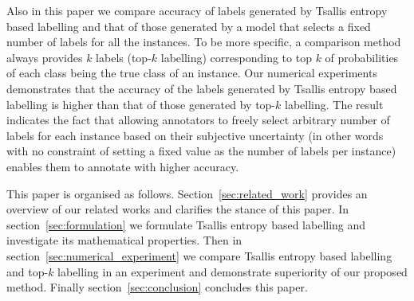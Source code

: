 \documentclass[a4paper,conference]{IEEEtran}
\begin{document}
Also in this paper we compare accuracy of labels generated by Tsallis entropy based labelling and that of those generated by a model that selects a fixed number of labels for all the instances.
To be more specific, a comparison method always provides $k$ labels (top-$k$ labelling) corresponding to top $k$ of probabilities of each class being the true class of an instance.
Our numerical experiments demonstrates that the accuracy of the labels generated by Tsallis entropy based labelling is higher than that of those generated by top-$k$ labelling.
The result indicates the fact that allowing annotators to freely select arbitrary number of labels for each instance based on their subjective uncertainty (in other words with no constraint of setting a fixed value as the number of labels per instance) enables them to annotate with higher accuracy.

This paper is organised as follows.
Section~\ref{sec:related_work} provides an overview of our related works and clarifies the stance of this paper. 
In section~\ref{sec:formulation} we formulate Tsallis entropy based labelling and investigate its mathematical properties.
Then in section~\ref{sec:numerical_experiment} we compare Tsallis entropy based labelling and top-$k$ labelling in an experiment and demonstrate superiority of our proposed method.
Finally section~\ref{sec:conclusion} concludes this paper.
\end{document}
